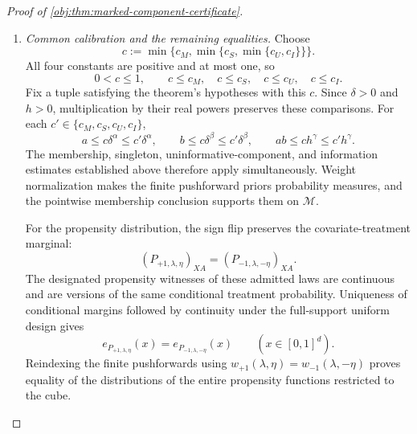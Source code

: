 \documentclass[11pt]{article}
\begin{document}
\begin{proof}[Proof of \cref{obj:thm:marked-component-certificate}]
\begin{enumerate}
For two densities against a common dominating measure, substitution into \cref{obj:def:hellinger} gives the integral of their squared square-root difference. Applying this identity and then integrating over covariates yields
\[
H^2(M_{+1},M_{-1})
=
\int
\left[
\int(\sqrt{g_{+1}(\mathbf x,\mathbf s)}
-\sqrt{g_{-1}(\mathbf x,\mathbf s)})^2
\,d\mu_{\mathrm{spin}}(\mathbf s)
\right]d\nu_{\mathrm{cov}}(\mathbf x).
\]
The finite graph counts are measurable, and all functions in the finite weighted count sum are integrable. Integrating the conditional bound therefore gives
\[
H^2(M_{+1},M_{-1})
\le
K_{\mathrm{info}}a^2b^2
\sum_{p_{\mathrm{cmp}}=2}^{N}
(9/2)^{p_{\mathrm{cmp}}}p_{\mathrm{cmp}}^4
\int C_{p_{\mathrm{cmp}}}^{\mathrm L}\,d\nu_{\mathrm{cov}}.
\]
Every term is nonnegative, so extending the size sum to the shifted range used above gives
\[
\begin{aligned}
H^2(M_{+1},M_{-1})
&\le
K_{\mathrm{info}}a^2b^2
\sum_{j=0}^{N-1}
(9/2)^{j+2}(j+2)^4
\int C_{j+2}^{\mathrm L}\,d\nu_{\mathrm{cov}}\\
&\le
K_{\mathrm{info}}C_{\mathrm{tree}}
nNh^d\delta^da^2b^2.
\end{aligned}
\]
Define
\[
C:=K_{\mathrm{info}}C_{\mathrm{tree}}>0.
\]
This proves the required information estimate under the amplitude conditions with \(c_I\) and the occupancy condition with \(c_0\).

\item \textit{Common calibration and the remaining equalities.}
Choose
\[
c:=\min\{c_M,\min\{c_S,\min\{c_U,c_I\}\}\}.
\]
All four constants are positive and at most one, so
\[
0<c\le1,
\qquad
c\le c_M,\quad c\le c_S,\quad c\le c_U,\quad c\le c_I.
\]
Fix a tuple satisfying the theorem's hypotheses with this \(c\). Since \(\delta>0\) and \(h>0\), multiplication by their real powers preserves these comparisons. For each
\(c'\in\{c_M,c_S,c_U,c_I\}\),
\[
a\le c\delta^\alpha\le c'\delta^\alpha,\qquad
b\le c\delta^\beta\le c'\delta^\beta,\qquad
ab\le ch^\gamma\le c'h^\gamma.
\]
The membership, singleton, uninformative-component, and information estimates established above therefore apply simultaneously. Weight normalization makes the finite pushforward priors probability measures, and the pointwise membership conclusion supports them on \(\mathcal M\).

For the propensity distribution, the sign flip preserves the covariate-treatment marginal:
\[
(P_{+1,\lambda,\eta})_{XA}
=
(P_{-1,\lambda,-\eta})_{XA}.
\]
The designated propensity witnesses of these admitted laws are continuous and are versions of the same conditional treatment probability. Uniqueness of conditional margins followed by continuity under the full-support uniform design gives
\[
e_{P_{+1,\lambda,\eta}}(x)
=
e_{P_{-1,\lambda,-\eta}}(x)
\qquad(x\in[0,1]^d).
\]
Reindexing the finite pushforwards using
\(w_{+1}(\lambda,\eta)=w_{-1}(\lambda,-\eta)\) proves equality of the distributions of the entire propensity functions restricted to the cube.


\end{enumerate}
\end{proof}
\end{document}
